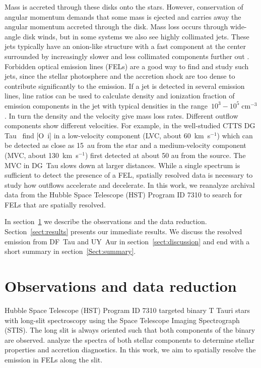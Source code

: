 \documentclass[twocolumn,trackchanges]{aastex62}
\begin{document}
Mass is accreted through these disks onto the stars. However,
conservation of angular momentum demands that some mass is ejected and
carries away the angular momentum accreted through
the disk. Mass
loss occurs through wide-angle disk winds, but in some systems we 
also see highly collimated jets. These jets typically have an onion-like
structure with a fast component at the center surrounded by increasingly
slower and less collimated components further
out \citep{2000ApJ...537L..49B}. Forbidden optical emission lines (FELs) are a
good way to find and study such jets, since the stellar photosphere and
the accretion shock are too dense to contribute significantly to the emission. If a
jet is detected in several emission lines, line ratios can be used to
calculate density and ionization fraction of emission components in the
jet with typical densities in the range~$10^3-10^5\;\mathrm{cm}^{-3}$
\citep[e.g.][]{1999A&A...342..717B,2000A&A...356L..41L,2013A&A...550L...1S}. In turn
the density and the velocity give mass loss rates. Different outflow
components show different velocities. For example, in the well-studied
CTTS DG Tau~\citet{2013A&A...550L...1S} find [O~{\sc i}] in a low-velocity
component (LVC, about 60~km~s$^{-1}$) which can be detected as
close as 15~au from the star and a medium-velocity component (MVC, about
130~km~s$^{-1}$) first detected at about 50 au from the source. The MVC in DG~Tau
slows down at larger distances. While a single spectrum is sufficient to
detect the presence of a FEL, spatially resolved data is necessary to study
how outflows accelerate and decelerate. In this work, we reanalyze
archival data from the Hubble Space Telescope (HST) Program ID 7310 to
search for FELs that are spatially resolved.

In section~\ref{sect:obs} we describe the observations and the data reduction. Section~\ref{sect:results} presents our immediate results. We discuss the resolved emission from DF~Tau and UY~Aur in section~\ref{sect:discussion} and end with a short summary in section~\ref{Sect:summary}.

\section{Observations and data reduction}
\label{sect:obs}



Hubble Space Telescope (HST) Program ID 7310 targeted binary T Tauri
stars with long-slit spectroscopy using the Space Telescope Imaging
Spectrograph (STIS). The long slit is always oriented such that both
components of the binary are observed. \citet{2003ApJ...583..334H} analyze the
spectra of both stellar components to determine stellar properties and
accretion diagnostics. In this work, we aim to spatially resolve the
emission in FELs along the slit.
\end{document}
